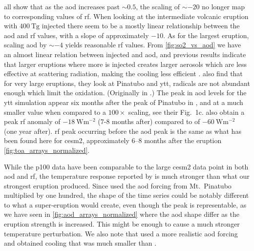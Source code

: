 \documentclass{ametsocV5}
\newcommand{\iso}[1][i]{{#1}njected \ce{SO2}}
\begin{document}

all show that as the \ac{aod} increases past \(\sim 0.5\), the scaling of \(\sim -20\)
no longer map to corresponding values of \ac{rf}. When looking at the intermediate
volcanic eruption with \(\SI{400}{\tera\gram}\) \iso{} there seem to be a mostly linear
relationship between the \ac{aod} and \ac{rf} values, with a slope of approximately
\(-10\). As for the largest eruption, scaling \ac{aod} by \(\sim-4\) yields reasonable
\ac{rf} values. From \cref{fig:so2_vs_aod} we have an almost linear relation between
\iso{} and \ac{aod}, and previous results indicate that larger eruptions where more
 is injected creates larger aerosols which are less effective at scattering
radiation, making the cooling less efficient
\citep{english2013,timmreck2010,timmreck2018}. \citet{timmreck2010} also find that for
very large eruptions, they look at Pinatubo and \ac{ytt},  radicals are not
abundant enough which limit the  oxidation. (Originally in \citep{bekki1995}.)
The peak in \ac{aod} levels for the \ac{ytt} simulation appear six months after the peak
of Pinatubo in \citet{timmreck2010}, and at a much smaller value when compared to a
\(100\times\) scaling, see their Fig.\ 1c. \citet{timmreck2010} also obtain a peak
\ac{rf} anomaly of \(\SI{-18}{\watt\metre^{-2}}\) (\(7\)-\(8\) months after) compared to
\citet{jones2005} of \(\SI{-60}{\watt\metre^{-2}}\) (one year after). \ac{rf} peak
occurring before the \ac{aod} peak is the same as what has been found here for
\ac{cesm2}, approximately \(6\)--\(8\) months after the eruption
\cref{fig:toa_arrays_normalized}.

While the \ac{p100} data have been comparable to the large \ac{cesm2} data point in both
\ac{aod} and \ac{rf}, the temperature response reported by \citet{jones2005} is much
stronger than what our strongest eruption produced. Since \citet{jones2005} used the
\ac{aod} forcing from Mt.\ Pinatubo multiplied by one hundred, the shape of the time
series could be notably different to what a super-eruption would create, even though the
peak is representable, as we have seen in \cref{fig:aod_arrays_normalized} where the
\ac{aod} shape differ as the eruption strength is increased. This might be enough to
cause a much stronger temperature perturbation. We also note that \citet{timmreck2010}
used a more realistic \ac{aod} forcing and obtained cooling that was much smaller than
\citet{jones2005}.
\end{document}
